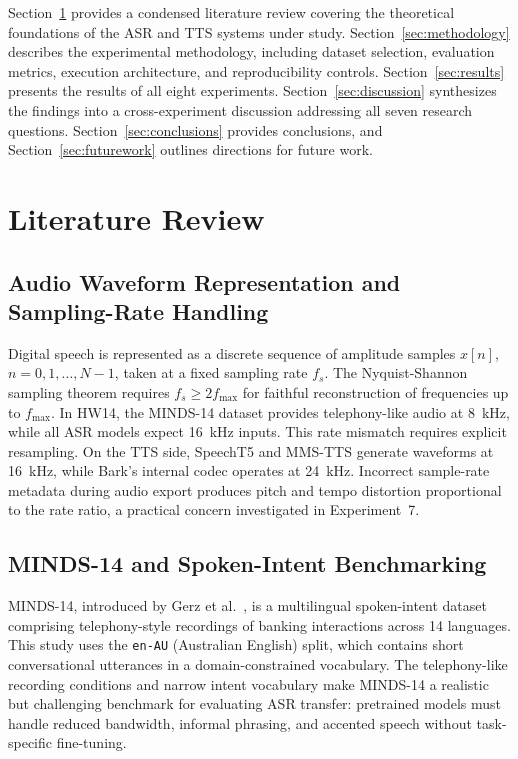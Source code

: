 \documentclass[conference]{IEEEtran}
\begin{document}
Section~\ref{sec:litreview} provides a condensed literature review covering the theoretical foundations of the ASR and TTS systems under study. Section~\ref{sec:methodology} describes the experimental methodology, including dataset selection, evaluation metrics, execution architecture, and reproducibility controls. Section~\ref{sec:results} presents the results of all eight experiments. Section~\ref{sec:discussion} synthesizes the findings into a cross-experiment discussion addressing all seven research questions. Section~\ref{sec:conclusions} provides conclusions, and Section~\ref{sec:futurework} outlines directions for future work.

\section{Literature Review}
\label{sec:litreview}

\subsection{Audio Waveform Representation and Sampling-Rate Handling}

Digital speech is represented as a discrete sequence of amplitude samples $x[n]$, $n = 0, 1, \ldots, N-1$, taken at a fixed sampling rate $f_s$. The Nyquist-Shannon sampling theorem requires $f_s \geq 2 f_{\max}$ for faithful reconstruction of frequencies up to $f_{\max}$. In HW14, the MINDS-14 dataset provides telephony-like audio at 8~kHz, while all ASR models expect 16~kHz inputs. This rate mismatch requires explicit resampling. On the TTS side, SpeechT5 and MMS-TTS generate waveforms at 16~kHz, while Bark's internal codec operates at 24~kHz. Incorrect sample-rate metadata during audio export produces pitch and tempo distortion proportional to the rate ratio, a practical concern investigated in Experiment~7.

\subsection{MINDS-14 and Spoken-Intent Benchmarking}

MINDS-14, introduced by Gerz et al.~\cite{gerz2021}, is a multilingual spoken-intent dataset comprising telephony-style recordings of banking interactions across 14 languages. This study uses the \texttt{en-AU} (Australian English) split, which contains short conversational utterances in a domain-constrained vocabulary. The telephony-like recording conditions and narrow intent vocabulary make MINDS-14 a realistic but challenging benchmark for evaluating ASR transfer: pretrained models must handle reduced bandwidth, informal phrasing, and accented speech without task-specific fine-tuning.
\end{document}

